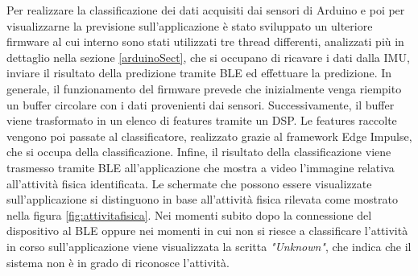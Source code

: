 Per realizzare la classificazione dei dati acquisiti dai sensori di Arduino e poi per visualizzarne la previsione sull'applicazione è stato sviluppato un ulteriore firmware al cui interno sono stati utilizzati tre thread differenti, analizzati più in dettaglio nella sezione \ref{arduinoSect}, che si occupano di ricavare i dati dalla IMU, inviare il risultato della predizione tramite BLE ed effettuare la predizione. In generale, il funzionamento del firmware prevede che inizialmente venga riempito un buffer circolare con i dati provenienti dai sensori. Successivamente, il buffer viene trasformato in un elenco di features tramite un DSP. Le features raccolte vengono poi passate al classificatore, realizzato grazie al framework Edge Impulse, che si occupa della classificazione. Infine, il risultato della classificazione viene trasmesso tramite BLE all'applicazione che mostra a video l'immagine relativa all'attività fisica identificata. Le schermate che possono essere visualizzate sull'applicazione si distinguono in base all'attività fisica rilevata come mostrato nella figura \ref{fig:attivitafisica}. Nei momenti subito dopo la connessione del dispositivo al BLE oppure nei momenti in cui non si riesce a classificare l'attività in corso sull'applicazione viene visualizzata la scritta \textit{"Unknown"}, che indica che il sistema non è in grado di riconosce l'attività.
